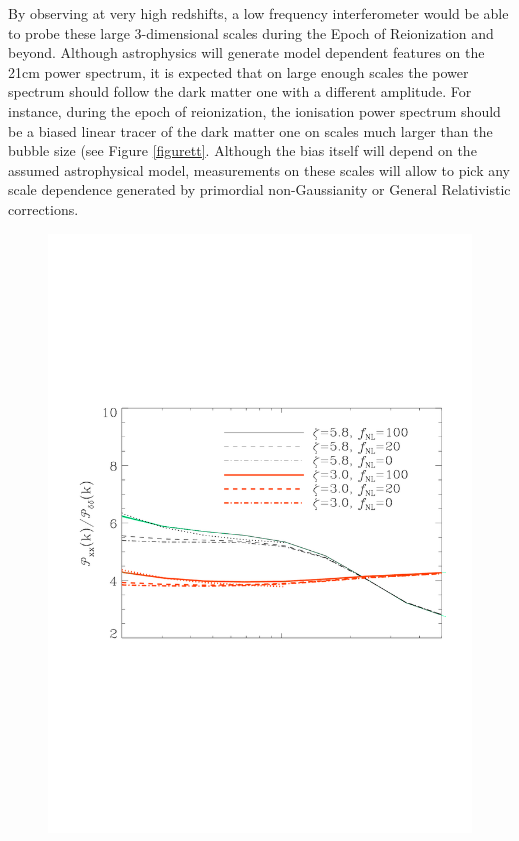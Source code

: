 \documentclass{PoS}
\begin{document}
By observing at very high redshifts, a low frequency interferometer would be able to probe these large 3-dimensional scales during the Epoch of Reionization and beyond. Although astrophysics will generate model dependent features on the 21cm power spectrum, it is expected that on large enough scales the power spectrum should follow the dark matter one with a different amplitude. For instance, during the epoch of reionization, the ionisation power spectrum should be a biased linear tracer of the dark matter one on scales much larger than the bubble size (see Figure \ref{figurett}. Although the bias itself will depend on the assumed astrophysical model, measurements on these scales will allow to pick any scale dependence generated by primordial non-Gaussianity  or General Relativistic corrections.
\begin{figure}[!t]
\includegraphics[scale=0.3]{figures/figure1.pdf}

\end{figure}
\end{document}
